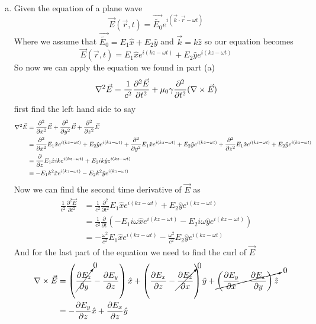 \documentclass[11pt]{article}
\numberwithin{equation}{section}
\newcommand{\grad}{\bold\nabla}
\newcommand{\vecE}{\vec{E}}
\begin{document}
\begin{enumerate}[(a)]
\item
Given the equation of a plane wave
$$\vec{E}(\vec{r},t) = \vec{\widetilde{E_0}}e^{i(\vec{k}\cdot\vec{r}-\omega t)}$$
Where we assume that $\vec{\widetilde{E_0}} = E_1\hat{x}+E_2\hat{y}$ and $\vec{k} = k\hat{z}$ so our equation becomes
$$\vec{E}(\vec{r},t) = E_1\hat{x}e^{i(kz-\omega t)} + E_2\hat{y}e^{i(kz-\omega t)}$$
So now we can apply the equation we found in part (a)
$$\grad^2\vec{E}=\frac{1}{c^2}\frac{\partial^2\vec{E}}{\partial t^2} +\mu_0\gamma\frac{\partial^2}{\partial t^2}(\grad\times\vec{E})$$
first find the left hand side to say 
\begin{align*}
\grad^2\vec{E} &= \frac{\partial^2}{\partial x^2}\vec{E} + \frac{\partial^2}{\partial y^2}\vec{E} + \frac{\partial^2}{\partial z^2}\vec{E}\\
&= \frac{\partial^2}{\partial x^2}E_1\hat{x}e^{i(kz-\omega t)}+ E_2\hat{y}e^{i(kz-\omega t)} + \frac{\partial^2}{\partial y^2}E_1\hat{x}e^{i(kz-\omega t)}+ E_2\hat{y}e^{i(kz-\omega t)} + \frac{\partial^2}{\partial z^2}E_1\hat{x}e^{i(kz-\omega t)}+ E_2\hat{y}e^{i(kz-\omega t)}\\
&= \frac{\partial}{\partial z}E_1\hat{x}ike^{i(kz-\omega t)}+ E_2ik\hat{y}e^{i(kz-\omega t)}\\
&= -E_1k^2\hat{x}e^{i(kz-\omega t)} - E_2k^2\hat{y}e^{i(kz-\omega t)}
\end{align*}
Now we can find the second time derivative of $\vecE$ as
\begin{align*}
\frac{1}{c^2}\frac{\partial^2\vec{E}}{\partial t^2} &=  \frac{1}{c^2}\frac{\partial^2}{\partial t^2} E_1\hat{x}e^{i(kz-\omega t)}+ E_2\hat{y}e^{i(kz-\omega t)}\\
&=  \frac{1}{c^2}\frac{\partial}{\partial t} \left(-E_1i\omega\hat{x}e^{i(kz-\omega t)}- E_2i\omega\hat{y}e^{i(kz-\omega t)}\right)\\
&=  -\frac{\omega^2}{c^2}E_1\hat{x}e^{i(kz-\omega t)}-\frac{\omega^2}{c^2}E_2\hat{y}e^{i(kz-\omega t)}
\end{align*}
And for the last part of the equation we need to find the curl of $\vecE$ 
\begin{align*}
\grad\times\vecE &= \left(\cancelto{0}{\frac{\partial E_z}{\partial y}}-\frac{\partial E_y}{\partial z}\right)\hat{x} + \left(\frac{\partial E_x}{\partial z}-\cancelto{0}{\frac{\partial E_z}{\partial x}}\right)\hat{y} + \cancelto{0}{\left(\frac{\partial E_y}{\partial x}-\frac{\partial E_x}{\partial y}\right)\hat{z}}\\
&=  -\frac{\partial E_y}{\partial z}\hat{x} + \frac{\partial E_x}{\partial z}\hat{y}\\

\end{align*}
\end{enumerate}
\end{document}
